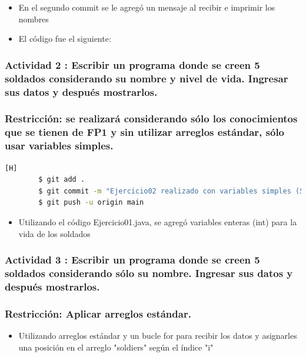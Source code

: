 \documentclass{article}
\begin{document}
	\begin{itemize}	
        \item En el segundo commit se le agregó un mensaje al recibir e imprimir los nombres
		\item El código fue el siguiente:
	\end{itemize}

	


    \subsubsection{Actividad 2 : Escribir un programa donde se creen 5 soldados considerando su nombre y nivel de vida. Ingresar sus datos y después mostrarlos. \\\\ 
    \color{red}Restricción: se realizará considerando sólo los conocimientos que se tienen de FP1 y sin utilizar arreglos estándar, sólo usar variables simples.}

	

    \begin{lstlisting}[language=bash,caption={Commit: Ejercicio02 realizado con variables simples (String e int) tanto para los nombres, como para la vida}][H]
		$ git add .
		$ git commit -m "Ejercicio02 realizado con variables simples (String e int) tanto para los nombres, como para la vida"			
		$ git push -u origin main
	\end{lstlisting}
    \begin{itemize}
        \item Utilizando el código Ejercicio01.java, se agregó variables enteras (int) para la vida de los soldados
    \end{itemize} 


    \subsubsection{Actividad 3 : Escribir un programa donde se creen 5 soldados considerando sólo su nombre. Ingresar sus datos y después mostrarlos. \\\\
    \color{red}Restricción: Aplicar arreglos estándar.}
    
    \begin{itemize}
        \item  Utilizando arreglos estándar y un bucle for para recibir los datos y asignarles una posición en el arreglo "soldiers" según el índice "i"
    \end{itemize} 
    
\end{document}
